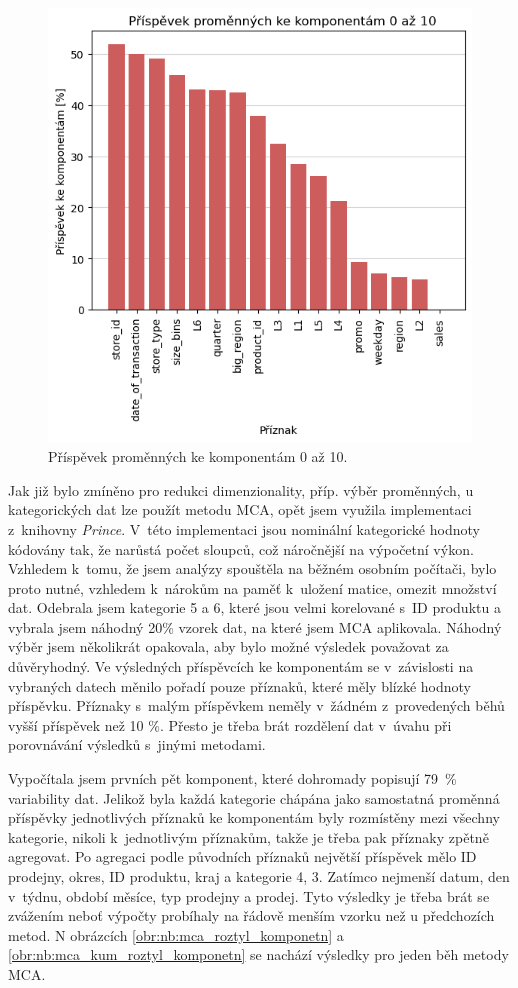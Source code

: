 \begin{figure}[h!]
    \centering
    \includegraphics[width=.6\textwidth]{obrazky/pripravadat/pca-prispevky.png}
    \caption{Příspěvek proměnných ke komponentám 0 až 10.}
    \label{obr:nb:pca_prispevek}
\end{figure}
    
Jak již bylo zmíněno pro redukci dimenzionality, příp. výběr proměnných, u kategorických dat lze použít metodu MCA, opět jsem využila implementaci z~knihovny \emph{Prince}. 
V~této implementaci jsou nominální kategorické hodnoty kódovány tak, že narůstá počet sloupců, což náročnější na výpočetní výkon. Vzhledem k~tomu, že jsem analýzy spouštěla na běžném osobním počítači, bylo proto nutné, vzhledem k~nárokům na paměť k~uložení matice, omezit množství dat. Odebrala jsem kategorie 5 a 6, které jsou velmi korelované s~ID produktu a vybrala jsem náhodný 20\% vzorek dat, na které jsem MCA aplikovala. Náhodný výběr jsem několikrát opakovala, aby bylo možné výsledek považovat za důvěryhodný. Ve výsledných příspěvcích ke komponentám se v~závislosti na vybraných datech měnilo pořadí pouze příznaků, které měly blízké hodnoty příspěvku. Příznaky s~malým příspěvkem neměly v~žádném z~provedených běhů vyšší příspěvek než 10 \%. Přesto je třeba brát rozdělení dat v~úvahu při porovnávání výsledků s~jinými metodami.

Vypočítala jsem prvních pět komponent, které dohromady popisují 79~\% variability dat. Jelikož byla každá kategorie chápána jako samostatná proměnná příspěvky jednotlivých příznaků ke komponentám byly rozmístěny mezi všechny kategorie, nikoli k~jednotlivým příznakům, takže je třeba pak příznaky zpětně agregovat.
Po agregaci podle původních příznaků největší příspěvek mělo ID prodejny, okres, ID produktu, kraj a kategorie 4, 3. Zatímco nejmenší datum, den v~týdnu, období měsíce, typ prodejny a prodej. Tyto výsledky je třeba brát se zvážením neboť výpočty probíhaly na řádově menším vzorku než u předchozích metod.
N obrázcích \ref*{obr:nb:mca_roztyl_komponetn} a \ref*{obr:nb:mca_kum_roztyl_komponetn} se nachází výsledky pro jeden běh metody MCA.

